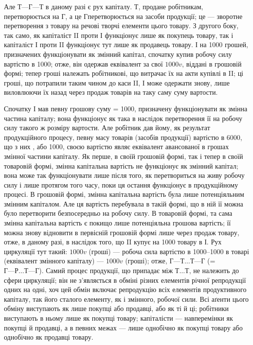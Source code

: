 Але $Т — Г — Т$ в даному разі є рух капіталу. Т, продане робітникам,
перетворюється на Г, а це $Г п$еретворюється на засоби продукції; це —
зворотне перетворення з товару на речові творчі елементи цього товару.
З другого боку, так само, як капіталіст II проти І функціонує лише як покупець
товару, так і капіталіст І проти II функціонує тут лише як продавець товару. І на 1000
грошей, призначених функціонувати як змінний капітал, спочатку купив робочу силу вартістю в 1000;
отже, він одержав еквівалент за свої $1000 v$, віддані в грошовій формі; тепер гроші належать
робітникові, що витрачає їх на акти купівлі в II; ці гроші, що потрапили таким чином до каси II, І
може одержати знову, лише виловлюючи їх назад через продаж товарів на таку саму суму вартости.

Спочатку І мав певну грошову суму = 1000, призначену функціонувати
як змінна частина капіталу; вона функціонує як така в наслідок перетворення її на робочу силу такого
ж розміру вартости. Але робітник дав йому, як результат продукційного процесу, певну масу товарів
(засобів продукції) вартістю в 6000, що з них , або 1000, своєю вартістю
являє еквівалент авансованої в грошах змінної частини капіталу. Як перше,
в своїй грошовій формі, так і тепер в своїй товаровій формі, змінна
капітальна вартість не функціонує як змінний капітал; вона може так
функціонувати лише після того, як перетвориться на живу робочу силу
і лише протягом того часу, поки ця остання функціонує в продукційному
процесі. В грошовій формі, змінна капітальна вартість була лише потенціяльним
змінним капіталом. Але ця вартість перебувала в такій формі,
що в ній її можна було перетворити безпосередньо на робочу силу.
В товаровій формі, та сама змінна капітальна вартість є покищо лише
потенціяльна грошова вартість; її можна знову відновити в первісній
грошовій формі лише через продаж товару, отже, в даному разі, в наслідок
того, що II купує на 1000 товару в І. Рух циркуляції тут такий:
$1000 v$ (гроші) — робоча сила вартістю в 1000--1000 в товарі (еквівалент
змінного капіталу) — $1000 v$ (гроші); отже, $Г — Т\dots{} Т — Г$ (= $Г — Р\dots{}
Т — Г$). Самий процес продукції, що припадає між $Т\dots{} Т$, не належить до
сфери циркуляції; він не з’являється в обміні різних елементів річної
репродукції одних на одні, хоч цей обмін включає репродукцію всіх
елементів продуктивного капіталу, так його сталого елементу, як і змінного,
робочої сили. Всі аґенти цього обміну виступають як лише покупці
або продавці, або як ті й ці; робітники виступають в ньому лише як
покупці товару; капіталісти — навперемінки як покупці й продавці, а в
певних межах — лише однобічно як покупці товару або однобічно як продавці
товару.

